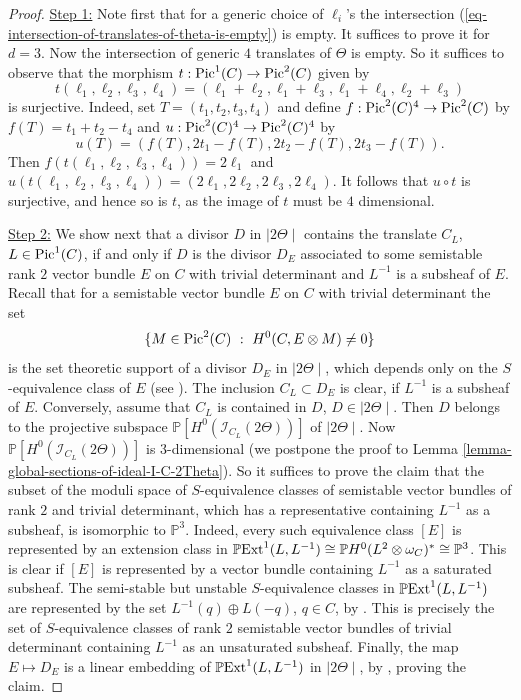 \documentclass[12pt]{amsart}
\numberwithin{equation}{subsection}
\theoremstyle{plain}
\theoremstyle{definition}
\newcommand{\PP}{{\mathbb P}}
\newcommand{\linsys}[1]{{\mid}#1{\mid}}
\newcommand{\Pic}{{\rm Pic}}
\newcommand{\Ext}{{\rm Ext}}
\newcommand{\Ideal}[1]{{\mathcal I}_{#1}}
\begin{document}
\begin{proof}
\underline{Step 1:} Note first that for a generic choice of $\ell_i$'s the intersection (\ref{eq-intersection-of-translates-of-theta-is-empty}) is empty.
It suffices to prove it for $d=3$. Now the intersection of generic $4$ translates of $\Theta$ is empty. So it suffices to observe that the morphism
 $t:\Pic^1(C)\rightarrow\Pic^2(C)$ given by
\[
t(\ell_1,\ell_2,\ell_3,\ell_4)= (\ell_1+\ell_2,\ell_1+\ell_3,\ell_1+\ell_4,\ell_2+\ell_3)
\]
is surjective. Indeed, set $T=(t_1,t_2,t_3,t_4)$ and define $f:\Pic^2(C)^4\rightarrow \Pic^2(C)$ by $f(T)=t_1+t_2-t_4$ and  $u:\Pic^2(C)^4\rightarrow\Pic^2(C)^4$ by
\[
u(T)=(f(T),2t_1-f(T),2t_2-f(T),2t_3-f(T)).
\]
Then $f(t(\ell_1,\ell_2,\ell_3,\ell_4))=2\ell_1$
and $u(t(\ell_1,\ell_2,\ell_3,\ell_4))=(2\ell_1,2\ell_2,2\ell_3,2\ell_4)$. It follows that $u\circ t$ is surjective, and hence so is $t$, as the image of $t$ must be $4$ dimensional.

\underline{Step 2:} We show next that a divisor $D$ in $\linsys{2\Theta}$ contains the translate $C_L$, $L\in \Pic^1(C)$, if and only if $D$ is the divisor $D_E$ associated to some semistable rank $2$ vector bundle $E$ on $C$ with trivial determinant  and $L^{-1}$ is a subsheaf of $E$. 
Recall that for a semistable vector bundle $E$ on $C$ with trivial determinant the set 
\[
\{M\in\Pic^2(C)  \ : \ H^0(C,E\otimes M)\neq 0\}
\]
is the set theoretic support of a divisor $D_E$ in $\linsys{2\Theta}$, which depends only on the $S$-equivalence class of $E$ 
(see \cite{NR}).
The inclusion $C_L\subset D_E$ is clear, if $L^{-1}$ is a subsheaf of $E$. Conversely, assume that $C_L$ is contained in $D$, $D\in\linsys{2\Theta}$. Then $D$ belongs to the projective subspace $\PP[H^0(\Ideal{C_L}(2\Theta))]$ of $\linsys{2\Theta}$. Now $\PP[H^0(\Ideal{C_L}(2\Theta))]$ is $3$-dimensional (we postpone the proof to Lemma \ref{lemma-global-sections-of-ideal-I-C-2Theta}). So it suffices to prove the claim that the subset of the moduli space of $S$-equivalence classes of semistable vector bundles of rank $2$ and trivial determinant, which has a representative containing $L^{-1}$ as a subsheaf, is isomorphic to $\PP^3$. Indeed, every such equivalence class $[E]$ is represented by an extension class in 
$\PP\Ext^1(L,L^{-1})\cong \PP H^0(L^2\otimes\omega_C)^*\cong\PP^3$. This is clear if $[E]$ is represented by a vector bundle containing $L^{-1}$ as a saturated subsheaf.
The semi-stable but unstable $S$-equivalence classes in $\PP\Ext^1(L,L^{-1})$ are represented by the set
$L^{-1}(q)\oplus L(-q)$, $q\in C$, by \cite[Lemma 3.6(b)]{beauville}. This is precisely the set of $S$-equivalence classes of rank $2$ semistable vector bundles of trivial determinant containing $L^{-1}$ as an unsaturated subsheaf.
Finally, the map $E\mapsto D_E$ is a linear embedding of $\PP\Ext^1(L,L^{-1})$ in $\linsys{2\Theta}$,
by \cite[Lemma 3.7]{beauville}, proving the claim.


\end{proof}
\end{document}
